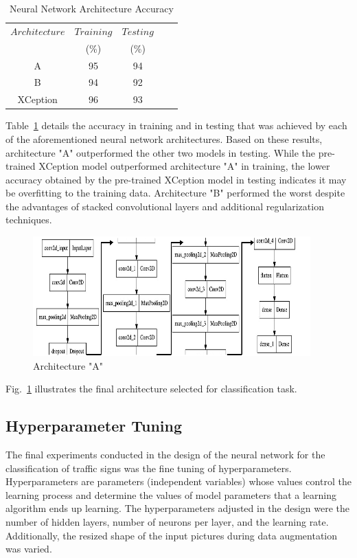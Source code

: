 \documentclass[conference]{IEEEtran}
\begin{document}
\begin{table}[htbp]
\caption{Neural Network Architecture Accuracy}
\label{table_arch}\centering
\begin{tabular}{ccccc}
\hline
$Architecture$&$Training$&$Testing$\\
&(\%)&(\%)\\
\hline
A&95&94\\
B&94&92\\
XCeption&96&93\\
\hline
\end{tabular}
\end{table}

Table~\ref{table_arch} details the accuracy in training and in testing that was achieved by each of the aforementioned neural network architectures. Based on these results, architecture "A" outperformed the other two models in testing. While the pre-trained XCeption model outperformed architecture "A" in training, the lower accuracy obtained by the pre-trained XCeption model in testing indicates it may be overfitting to the training data. Architecture "B" performed the worst despite the advantages of stacked convolutional layers and additional regularization techniques.

\begin{figure}[h]
\centerline{\includegraphics{Architecture_A_Small.png}}
\caption{Architecture "A"}
\label{fig_archA}
\end{figure}

Fig.~\ref{fig_archA} illustrates the final architecture selected for classification task.

\subsection{Hyperparameter Tuning}
The final experiments conducted in the design of the neural network for the classification of traffic signs was the fine tuning of hyperparameters. Hyperparameters are parameters (independent variables) whose values control the learning process and determine the values of model parameters that a learning algorithm ends up learning\cite{b3}. The hyperparameters adjusted in the design were the number of hidden layers, number of neurons per layer, and the learning rate. Additionally, the resized shape of the input pictures during data augmentation was varied.
\end{document}

